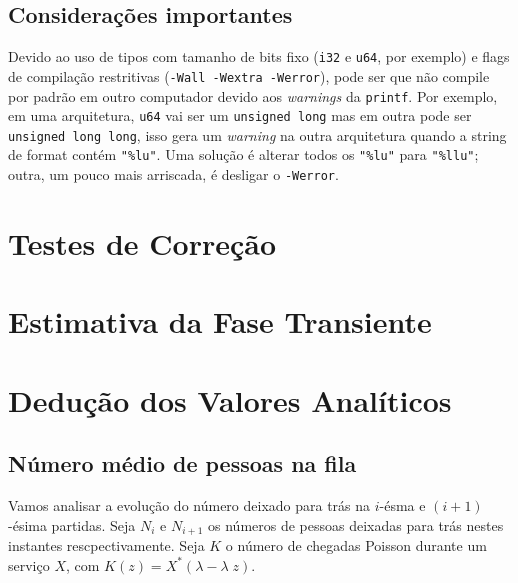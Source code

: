 \documentclass[a4paper]{article}
\newcommand{\inlcode}{\texttt}
\begin{document}
\subsection{Considerações importantes}

Devido ao uso de tipos com tamanho de bits fixo
(\inlcode{i32} e \inlcode{u64}, por exemplo)
e flags de compilação restritivas (\inlcode{-Wall -Wextra -Werror}),
pode ser que não compile por padrão em outro computador
devido aos \emph{warnings} da \inlcode{printf}.
Por exemplo, em uma arquitetura,
\inlcode{u64} vai ser um \inlcode{unsigned long}
mas em outra pode ser \inlcode{unsigned long long},
isso gera um \emph{warning} na outra arquitetura
quando a string de format contém \verb."%lu"..
Uma solução é alterar todos os
\verb."%lu". para \verb."%llu".;
outra, um pouco mais arriscada,
é desligar o \inlcode{-Werror}.

\section{Testes de Correção}
\section{Estimativa da Fase Transiente}

\newpage
\section{Dedução dos Valores Analíticos}
\subsection{Número médio de pessoas na fila}
Vamos analisar a evolução do número
deixado para trás na \(i\)-ésma e \((i+1)\)-ésima partidas.
Seja \(N_i\) e  \(N_{i+1}\) os números de pessoas
deixadas para trás nestes instantes rescpectivamente.
Seja \(K\) o número de chegadas Poisson
durante um serviço \(X\),
com \(K(z) = X^*(\lambda - \lambda \; z)\).
\end{document}

